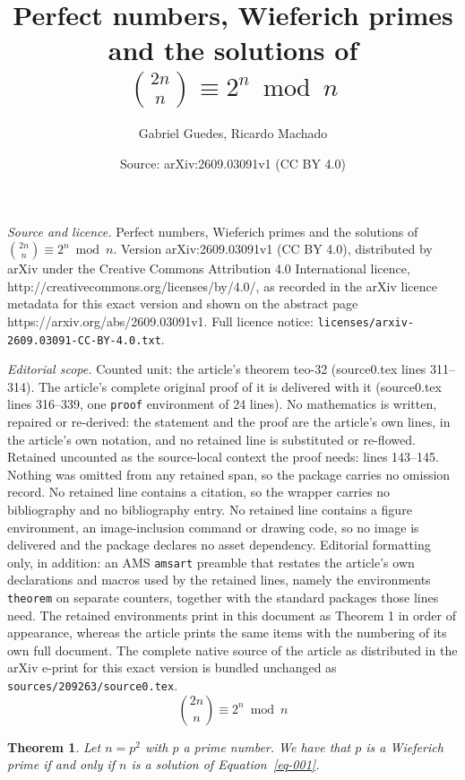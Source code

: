 \documentclass[10pt,a4paper]{amsart}
\title{Perfect numbers, Wieferich primes and the solutions of \texorpdfstring{$\displaystyle\binom{2n}{n}\equiv 2^n \bmod n$} {binomial (2n,n) congruent to 2^n modulo n}}
\author{Gabriel Guedes, Ricardo Machado}
\date{Source: arXiv:2609.03091v1 (CC BY 4.0)}
\newtheorem{theorem}{Theorem}
\begin{document}
\maketitle

\noindent\emph{Source and licence.} Perfect numbers, Wieferich primes and the solutions of \texorpdfstring{$\displaystyle\binom{2n}{n}\equiv 2^n \bmod n$} {binomial (2n,n) congruent to 2^n modulo n}. Version arXiv:2609.03091v1 (CC BY 4.0), distributed by arXiv under the Creative Commons Attribution 4.0 International licence, http://creativecommons.org/licenses/by/4.0/, as recorded in the arXiv licence metadata for this exact version and shown on the abstract page https://arxiv.org/abs/2609.03091v1. Full licence notice: \texttt{licenses/arxiv-2609.03091-CC-BY-4.0.txt}.\par\smallskip

\noindent\textit{Editorial scope.} Counted unit: the article's theorem teo-32 (source0.tex lines 311--314). The article's complete original proof of it is delivered with it (source0.tex lines 316--339, one \texttt{proof} environment of 24 lines). No mathematics is written, repaired or re-derived: the statement and the proof are the article's own lines, in the article's own notation, and no retained line is substituted or re-flowed.  Retained uncounted as the source-local context the proof needs: lines 143--145.  Nothing was omitted from any retained span, so the package carries no omission record.  No retained line contains a citation, so the wrapper carries no bibliography and no bibliography entry.  No retained line contains a figure environment, an image-inclusion command or drawing code, so no image is delivered and the package declares no asset dependency.  Editorial formatting only, in addition: an AMS \texttt{amsart} preamble that restates the article's own declarations and macros used by the retained lines, namely the environments \texttt{theorem} on separate counters, together with the standard packages those lines need.  The retained environments print in this document as Theorem 1 in order of appearance, whereas the article prints the same items with the numbering of its own full document.  The complete native source of the article as distributed in the arXiv e-print for this exact version is bundled unchanged as \texttt{sources/209263/source0.tex}.
\begin{equation} \label{eq-001}
\binom{2n}{n} \equiv 2^n \bmod n
\end{equation}

\begin{theorem}\label{teo-32}
Let $n=p^2$ with $p$ a prime number. We have that
$p$ is a Wieferich prime if and only if  $n$ is a solution of Equation~\eqref{eq-001}.
\end{theorem}
\end{document}
